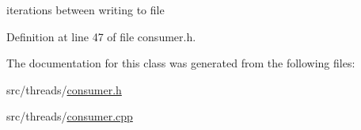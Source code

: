 iterations between writing to file 



Definition at line 47 of file consumer.\+h.



The documentation for this class was generated from the following files\+:\begin{DoxyCompactItemize}
\item 
src/threads/\hyperlink{consumer_8h}{consumer.\+h}\item 
src/threads/\hyperlink{consumer_8cpp}{consumer.\+cpp}\end{DoxyCompactItemize}
